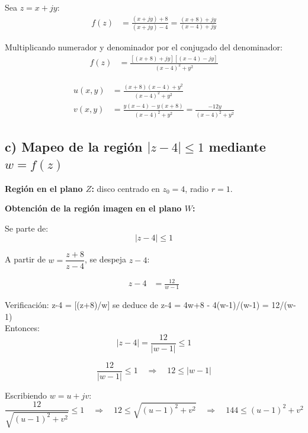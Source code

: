 \documentclass[12pt,a4paper]{article}
\begin{document}
 
Sea $z = x + jy$:
\begin{align*}
    f(z) &= \frac{(x+jy) + 8}{(x+jy) - 4}
           = \frac{(x+8) + jy}{(x-4) + jy}
\end{align*}
 
Multiplicando numerador y denominador por el conjugado del denominador:
\begin{align*}
    f(z) &= \frac{\left[(x+8)+jy\right]\left[(x-4)-jy\right]}{(x-4)^2 + y^2}
\end{align*}
 
\begin{align*}
    u(x,y) &= \frac{(x+8)(x-4) + y^2}{(x-4)^2 + y^2} \\[6pt]
    v(x,y) &= \frac{y(x-4) - y(x+8)}{(x-4)^2 + y^2}
             = \frac{-12y}{(x-4)^2 + y^2}
\end{align*}
 
\subsection {c) Mapeo de la región $|z - 4| \leq 1$ mediante $w = f(z)$}
 
\textbf{Región en el plano $Z$:} disco centrado en $z_0 = 4$, radio $r = 1$.
 
\textbf{Obtención de la región imagen en el plano $W$:}
 
Se parte de:
\[
    |z - 4| \leq 1
\]
 
A partir de $w = \dfrac{z+8}{z-4}$, se despeja $z - 4$:
 
\begin{align*}
    z - 4 &= \frac{12}{w - 1}
\end{align*}

Verificación: z-4 = [(z+8)/w] se deduce de z-4 = 4w+8 - 4(w-1)/(w-1) = 12/(w-1)\\
 
Entonces:
\[
    |z - 4| = \frac{12}{|w - 1|} \leq 1
\]
 
\[
    \frac{12}{|w - 1|} \leq 1 \quad \Rightarrow \quad 12 \leq |w - 1|
\]
 
Escribiendo $w = u + jv$:
\[
    \frac{12}{\sqrt{(u-1)^2 + v^2}} \leq 1
    \quad \Rightarrow \quad
    12 \leq \sqrt{(u-1)^2 + v^2}
    \quad \Rightarrow \quad
    144 \leq (u-1)^2 + v^2
\]
 
\end{document}

